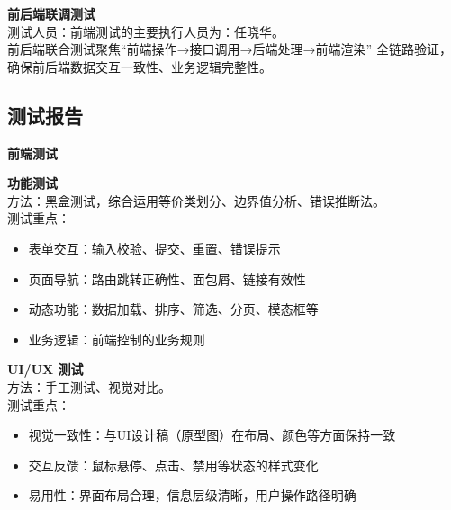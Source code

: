 \begin{levellist}
    \item \textbf{前后端联调测试} \\
    测试人员：前端测试的主要执行人员为：任晓华。\\
    前后端联合测试聚焦“前端操作→接口调用→后端处理→前端渲染” 全链路验证，确保前后端数据交互一致性、业务逻辑完整性。

\end{levellist}


\subsection{测试报告}

\begin{levellist}
    \item \textbf{前端测试}

    \begin{levellist}
        \item \textbf{功能测试} \\
        方法：黑盒测试，综合运用等价类划分、边界值分析、错误推断法。\\
        测试重点：
        \begin{itemize}
            \item 表单交互：输入校验、提交、重置、错误提示
            \item 页面导航：路由跳转正确性、面包屑、链接有效性
            \item 动态功能：数据加载、排序、筛选、分页、模态框等
            \item 业务逻辑：前端控制的业务规则
        \end{itemize}

        \item \textbf{UI/UX 测试} \\
        方法：手工测试、视觉对比。\\
        测试重点：
        \begin{itemize}
            \item 视觉一致性：与UI设计稿（原型图）在布局、颜色等方面保持一致
            \item  交互反馈：鼠标悬停、点击、禁用等状态的样式变化
            \item  易用性：界面布局合理，信息层级清晰，用户操作路径明确
        \end{itemize}


\end{levellist}
\end{levellist}
